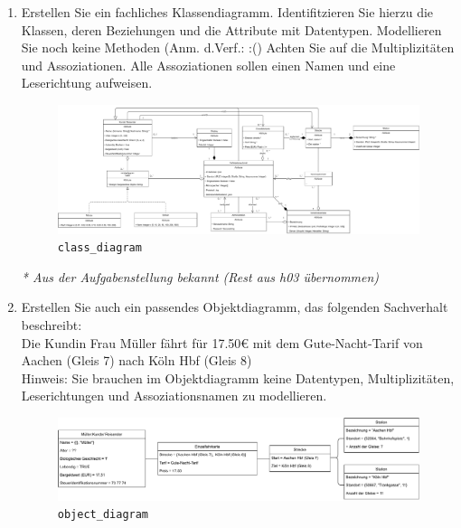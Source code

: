 \documentclass{article}
\newcommand{\gqq}[1]{\glqq{}#1\grqq{}}
\begin{document}
    \begin{enumerate}[label=\alph*.]
        \item Erstellen Sie ein fachliches Klassendiagramm.
            Identifitzieren Sie hierzu die Klassen, deren Beziehungen und die Attribute mit Datentypen.
            Modellieren Sie noch keine Methoden (Anm. d.Verf.: \gqq{:(})
            Achten Sie auf die Multiplizitäten und Assoziationen.
            Alle Assoziationen sollen einen Namen und eine Leserichtung aufweisen.

            \begin{figure}[ht]
                \includegraphics[width=\textwidth]{swt_wende_tim_h04_class_diagram.pdf}
                \caption{\texttt{class\_diagram}}
            \end{figure}
            \begin{center}
                \emph{* Aus der Aufgabenstellung bekannt (Rest aus h03 übernommen)}
            \end{center}
            
        \item Erstellen Sie auch ein passendes Objektdiagramm, das folgenden Sachverhalt beschreibt:\\
            Die Kundin Frau Müller fährt für 17.50€ mit dem Gute-Nacht-Tarif von Aachen (Gleis 7) nach Köln Hbf (Gleis 8)\\
            Hinweis: Sie brauchen im Objektdiagramm keine Datentypen, Multiplizitäten, Leserichtungen und Assoziationsnamen zu modellieren.

            \begin{figure}[ht]
                \includegraphics[width=\textwidth]{swt_wende_tim_h04_object_diagram.pdf}
                \caption{\texttt{object\_diagram}}
            \end{figure}
    \end{enumerate}
\end{document}
